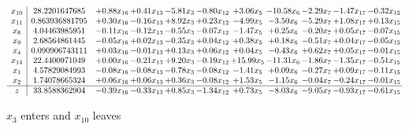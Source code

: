 \documentclass[9pt]{article}
\begin{document}
 \[\begin{array}{c| c c@{\hskip 2pt} c@{\hskip 2pt} c@{\hskip 2pt} c@{\hskip 2pt} c@{\hskip 2pt} c@{\hskip 2pt} c@{\hskip 2pt} c@{\hskip 2pt} c@{\hskip 2pt} }
 x_{10}   &  28.2201647685 & +  0.88 x_{16} & +  0.41 x_{13} & -5.81 x_{3} & -0.80 x_{12} & +  3.06 x_{5} & -10.58 x_{6} & -2.29 x_{7} & -1.47 x_{17} & -0.32 x_{15}\\
 x_{11}   &  0.863936881795 & +  0.30 x_{16} & -0.16 x_{13} & +  8.92 x_{3} & +  0.23 x_{12} & -4.99 x_{5} & -3.50 x_{6} & -5.29 x_{7} & +  1.08 x_{17} & +  0.13 x_{15}\\
 x_{8}   &  4.04463985951 & -0.11 x_{16} & -0.12 x_{13} & -0.55 x_{3} & -0.07 x_{12} & -1.47 x_{5} & +  0.25 x_{6} & -0.20 x_{7} & +  0.05 x_{17} & -0.07 x_{15}\\
 x_{9}   &  2.68564861445 & -0.05 x_{16} & +  0.02 x_{13} & -0.35 x_{3} & +  0.04 x_{12} & +  0.38 x_{5} & +  0.18 x_{6} & -0.51 x_{7} & +  0.04 x_{17} & -0.05 x_{15}\\
 x_{4}   &  0.090906743111 & +  0.03 x_{16} & -0.01 x_{13} & +  0.13 x_{3} & +  0.06 x_{12} & +  0.04 x_{5} & -0.43 x_{6} & +  0.62 x_{7} & +  0.05 x_{17} & -0.01 x_{15}\\
 x_{14}   &  22.4400971049 & +  0.00 x_{16} & -0.21 x_{13} & +  9.20 x_{3} & -0.19 x_{12} & + 15.99 x_{5} & -11.31 x_{6} & -1.86 x_{7} & -1.35 x_{17} & -0.51 x_{15}\\
 x_{1}   &  4.57829084993 & -0.08 x_{16} & -0.08 x_{13} & -0.78 x_{3} & -0.08 x_{12} & -1.41 x_{5} & +  0.09 x_{6} & -0.27 x_{7} & +  0.09 x_{17} & -0.11 x_{15}\\
 x_{2}   &  1.74078665324 & +  0.06 x_{16} & +  0.06 x_{13} & +  0.36 x_{3} & -0.08 x_{12} & +  1.53 x_{5} & -1.15 x_{6} & -0.04 x_{7} & -0.24 x_{17} & -0.01 x_{15}\\
\hline
z    &  33.8588362904 & -0.39 x_{16} & -0.33 x_{13} & +  0.85 x_{3} & -1.34 x_{12} & +  0.73 x_{5} & -8.03 x_{6} & -9.05 x_{7} & -0.93 x_{17} & -0.61 x_{15}\\
\end{array}\]


 $ x_{3} $ enters and $ x_{10} $ leaves 
\end{document}
